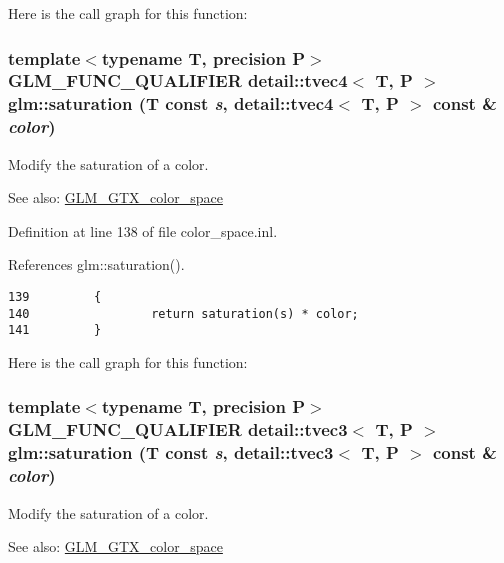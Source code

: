 Here is the call graph for this function:\hypertarget{group__gtx__color__space_g1ab05270ac2afa8e67b0d268e5c92573}{
\subsubsection[saturation]{\setlength{\rightskip}{0pt plus 5cm}template$<$typename T, precision P$>$ GLM\_\-FUNC\_\-QUALIFIER detail::tvec4$<$ T, P $>$ glm::saturation (T const {\em s}, \/  detail::tvec4$<$ T, P $>$ const \& {\em color})}}
\label{group__gtx__color__space_g1ab05270ac2afa8e67b0d268e5c92573}


Modify the saturation of a color. \begin{Desc}
\item[See also:]\hyperlink{group__gtx__color__space}{GLM\_\-GTX\_\-color\_\-space} \end{Desc}


Definition at line 138 of file color\_\-space.inl.

References glm::saturation().

\begin{Code}\begin{verbatim}139         {
140                 return saturation(s) * color;
141         }
\end{verbatim}
\end{Code}




Here is the call graph for this function:\hypertarget{group__gtx__color__space_gc45433ff3d2f2f3657edfcf9ee24800d}{
\subsubsection[saturation]{\setlength{\rightskip}{0pt plus 5cm}template$<$typename T, precision P$>$ GLM\_\-FUNC\_\-QUALIFIER detail::tvec3$<$ T, P $>$ glm::saturation (T const {\em s}, \/  detail::tvec3$<$ T, P $>$ const \& {\em color})}}
\label{group__gtx__color__space_gc45433ff3d2f2f3657edfcf9ee24800d}


Modify the saturation of a color. \begin{Desc}
\item[See also:]\hyperlink{group__gtx__color__space}{GLM\_\-GTX\_\-color\_\-space} \end{Desc}


